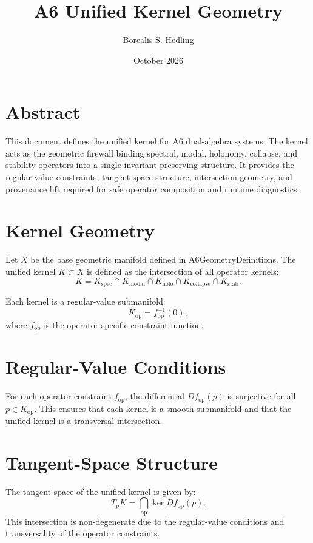 \documentclass[11pt]{article}
\title{A6 Unified Kernel Geometry}
\author{Borealis S. Hedling}
\date{October 2026}
\begin{document}
\maketitle

\section*{Abstract}
This document defines the unified kernel for A6 dual-algebra systems. The kernel
acts as the geometric firewall binding spectral, modal, holonomy, collapse, and
stability operators into a single invariant-preserving structure. It provides
the regular-value constraints, tangent-space structure, intersection geometry,
and provenance lift required for safe operator composition and runtime
diagnostics.

\section{Kernel Geometry}
Let $X$ be the base geometric manifold defined in A6GeometryDefinitions. The
unified kernel $K \subset X$ is defined as the intersection of all operator
kernels:
\[
K = K_{\text{spec}} \cap K_{\text{modal}} \cap K_{\text{holo}} \cap
    K_{\text{collapse}} \cap K_{\text{stab}}.
\]

Each kernel is a regular-value submanifold:
\[
K_{\text{op}} = f_{\text{op}}^{-1}(0),
\]
where $f_{\text{op}}$ is the operator-specific constraint function.

\section{Regular-Value Conditions}
For each operator constraint $f_{\text{op}}$, the differential
$Df_{\text{op}}(p)$ is surjective for all $p \in K_{\text{op}}$. This ensures
that each kernel is a smooth submanifold and that the unified kernel is a
transversal intersection.

\section{Tangent-Space Structure}
The tangent space of the unified kernel is given by:
\[
T_p K = \bigcap_{\text{op}} \ker Df_{\text{op}}(p).
\]
This intersection is non-degenerate due to the regular-value conditions and
transversality of the operator constraints.
\end{document}
